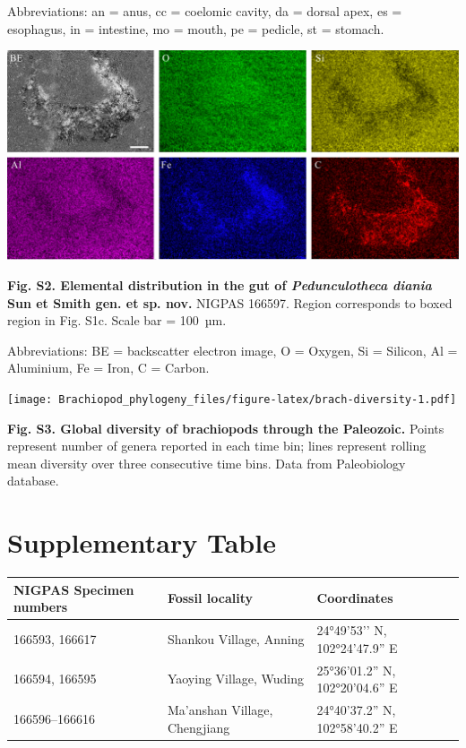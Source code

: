 \documentclass[openany]{book}
\theoremstyle{definition}
\theoremstyle{definition}
\theoremstyle{definition}
\theoremstyle{remark}
\begin{document}
Abbreviations: an = anus, cc = coelomic cavity, da = dorsal apex, es =
esophagus, in = intestine, mo = mouth, pe = pedicle, st = stomach.

\clearpage

\begin{center}\includegraphics[width=0.8\linewidth]{images/image2} \end{center}

\textbf{Fig. S2. Elemental distribution in the gut of
\emph{Pedunculotheca diania} Sun et Smith gen. et sp. nov.} NIGPAS
166597. Region corresponds to boxed region in Fig. S1c. Scale bar =
100~µm.

Abbreviations: BE = backscatter electron image, O = Oxygen, Si =
Silicon, Al = Aluminium, Fe = Iron, C = Carbon.

\clearpage

\texttt{[image: Brachiopod\_phylogeny\_files/figure-latex/brach-diversity-1.pdf]}

\textbf{Fig. S3. Global diversity of brachiopods through the Paleozoic.}
Points represent number of genera reported in each time bin; lines
represent rolling mean diversity over three consecutive time bins. Data
from Paleobiology database.

\clearpage

\chapter*{Supplementary Table}\label{table}

\begin{tabular}{l|l|l}
\hline
NIGPAS Specimen numbers & Fossil locality & Coordinates\\
\hline
166593, 166617 & Shankou Village, Anning & 24°49’53’’ N, 102°24’47.9” E\\
\hline
166594, 166595 & Yaoying Village, Wuding & 25°36’01.2” N, 102°20’04.6” E\\
\hline
166596--166616 & Ma'anshan Village, Chengjiang & 24°40’37.2” N, 102°58’40.2” E\\
\hline
\end{tabular}
\end{document}
